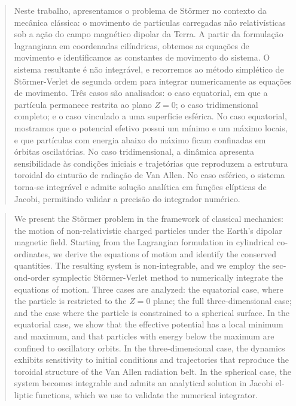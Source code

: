 \documentclass[twocolumn]{rbef}
\author[]{Pedro H. S. Cunha$^{1^*}$, Alexandre G. M. Schmidt$^{1}$}
\affil[]{$^1$ Instituto de Ciências Exatas, Universidade Federal Fluminense, Volta Redonda, RJ, Brasil.
\thanks{\href{emailto:henrique.pedrouff@gmail.com}{henrique.pedrouff@gmail.com}}}
\begin{document}
\begin{primeirapagina}

\begin{abstract}
Neste trabalho, apresentamos o problema de Störmer no contexto da mecânica clássica: o movimento de partículas carregadas não relativísticas sob a ação do campo magnético dipolar da Terra. A partir da formulação lagrangiana em coordenadas cilíndricas, obtemos as equações de movimento e identificamos as constantes de movimento do sistema. O sistema resultante é não integrável, e recorremos ao método simplético de Störmer-Verlet de segunda ordem para integrar numericamente as equações de movimento. Três casos são analisados: o caso equatorial, em que a partícula permanece restrita ao plano $Z = 0$; o caso tridimensional completo; e o caso vinculado a uma superfície esférica. No caso equatorial, mostramos que o potencial efetivo possui um mínimo e um máximo locais, e que partículas com energia abaixo do máximo ficam confinadas em órbitas oscilatórias. No caso tridimensional, a dinâmica apresenta sensibilidade às condições iniciais e trajetórias que reproduzem a estrutura toroidal do cinturão de radiação de Van Allen. No caso esférico, o sistema torna-se integrável e admite solução analítica em funções elípticas de Jacobi, permitindo validar a precisão do integrador numérico.
\end{abstract}

\begin{otherlanguage}{english}
\begin{abstract}
We present the Störmer problem in the framework of classical mechanics: the motion of non-relativistic charged particles under the Earth's dipolar magnetic field. Starting from the Lagrangian formulation in cylindrical coordinates, we derive the equations of motion and identify the conserved quantities. The resulting system is non-integrable, and we employ the second-order symplectic Störmer-Verlet method to numerically integrate the equations of motion. Three cases are analyzed: the equatorial case, where the particle is restricted to the $Z = 0$ plane; the full three-dimensional case; and the case where the particle is constrained to a spherical surface. In the equatorial case, we show that the effective potential has a local minimum and maximum, and that particles with energy below the maximum are confined to oscillatory orbits. In the three-dimensional case, the dynamics exhibits sensitivity to initial conditions and trajectories that reproduce the toroidal structure of the Van Allen radiation belt. In the spherical case, the system becomes integrable and admits an analytical solution in Jacobi elliptic functions, which we use to validate the numerical integrator.
\end{abstract}
\end{otherlanguage}

\end{primeirapagina}
\saythanks
\end{document}
